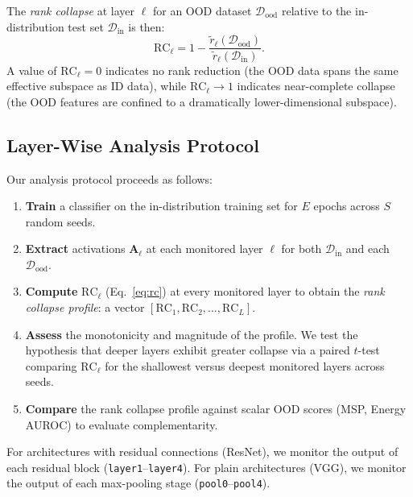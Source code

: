 \documentclass{article}
\begin{document}
The \emph{rank collapse} at layer $\ell$ for an OOD dataset $\mathcal{D}_\text{ood}$ relative to the in-distribution test set $\mathcal{D}_\text{in}$ is then:
\begin{equation}
    \text{RC}_\ell = 1 - \frac{\widetilde{r}_\ell(\mathcal{D}_\text{ood})}{\widetilde{r}_\ell(\mathcal{D}_\text{in})}.
    \label{eq:rc}
\end{equation}
A value of $\text{RC}_\ell = 0$ indicates no rank reduction (the OOD data spans the same effective subspace as ID data), while $\text{RC}_\ell \to 1$ indicates near-complete collapse (the OOD features are confined to a dramatically lower-dimensional subspace).

\subsection{Layer-Wise Analysis Protocol}
\label{sec:protocol}

Our analysis protocol proceeds as follows:
\begin{enumerate}
    \item \textbf{Train} a classifier on the in-distribution training set for $E$ epochs across $S$ random seeds.
    \item \textbf{Extract} activations $\mathbf{A}_\ell$ at each monitored layer $\ell$ for both $\mathcal{D}_\text{in}$ and each $\mathcal{D}_\text{ood}$.
    \item \textbf{Compute} $\text{RC}_\ell$ (Eq.~\ref{eq:rc}) at every monitored layer to obtain the \emph{rank collapse profile}: a vector $[\text{RC}_1, \text{RC}_2, \ldots, \text{RC}_L]$.
    \item \textbf{Assess} the monotonicity and magnitude of the profile. We test the hypothesis that deeper layers exhibit greater collapse via a paired $t$-test comparing $\text{RC}_\ell$ for the shallowest versus deepest monitored layers across seeds.
    \item \textbf{Compare} the rank collapse profile against scalar OOD scores (MSP, Energy AUROC) to evaluate complementarity.
\end{enumerate}

For architectures with residual connections (ResNet), we monitor the output of each residual block (\texttt{layer1}--\texttt{layer4}). For plain architectures (VGG), we monitor the output of each max-pooling stage (\texttt{pool0}--\texttt{pool4}).

\end{document}
